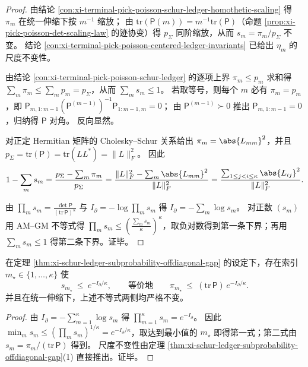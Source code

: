 \begin{proof}
由结论 \ref{con:xi-terminal-pick-poisson-schur-ledger-homothetic-scaling} 得 \(\pi_m\) 在统一伸缩下按 \(m^{-1}\) 缩放；
由 \(\mathrm{tr}(\mathsf P(m))=m^{-1}\mathrm{tr}(\mathsf P)\)（命题 \ref{prop:xi-pick-poisson-det-scaling-law} 的迹协变）得 \(p_\Sigma\) 同阶缩放，从而 \(s_m=\pi_m/p_\Sigma\) 不变。
结论 \ref{con:xi-terminal-pick-poisson-centered-ledger-invariants} 已给出 \(\eta_m\) 的尺度不变性。
\par
由结论 \ref{con:xi-terminal-pick-poisson-schur-ledger} 的逐项上界 \(\pi_m\le p_m\) 求和得 \(\sum_m\pi_m\le\sum_m p_m=p_\Sigma\)，从而 \(\sum_m s_m\le 1\)。
若取等号，则每个 \(m\) 必有 \(\pi_m=p_m\)，即
\(
\mathsf P_{m,1:m-1}(\mathsf P^{(m-1)})^{-1}\mathsf P_{1:m-1,m}=0
\)；
由 \(\mathsf P^{(m-1)}\succ 0\) 推出 \(\mathsf P_{m,1:m-1}=0\)，归纳得 \(\mathsf P\) 对角。
反向显然。
\par
对正定 Hermitian 矩阵的 Cholesky--Schur 关系给出 \(\pi_m=\abs{L_{mm}}^2\)，并且
\(
p_\Sigma=\mathrm{tr}(\mathsf P)=\mathrm{tr}(LL^\ast)=\|L\|_F^2
\)。
因此
\[
1-\sum_m s_m
=\frac{p_\Sigma-\sum_m\pi_m}{p_\Sigma}
=\frac{\|L\|_F^2-\sum_m\abs{L_{mm}}^2}{\|L\|_F^2}
=\frac{\sum_{1\le j<i\le\kappa}\abs{L_{ij}}^2}{\|L\|_F^2}.
\]
\par
由 \(\prod_m s_m=\frac{\det\mathsf P}{(\mathrm{tr}\,\mathsf P)^{\kappa}}\) 与 \(I_\partial=-\log\prod_m s_m\) 得 \(I_\partial=-\sum_m\log s_m\)。
对正数 \((s_m)\) 用 AM--GM 不等式得
\(
\prod_m s_m\le (\frac{\sum_m s_m}{\kappa})^\kappa
\)，取负对数得到第一条下界；再用 \(\sum_m s_m\le 1\) 得第二条下界。证毕。
\end{proof}

\begin{auditcor}\label{cor:xi-schur-ledger-bottleneck-share}
在定理 \ref{thm:xi-schur-ledger-subprobability-offdiagonal-gap} 的设定下，存在索引 \(m_\star\in\{1,\dots,\kappa\}\) 使
\[
s_{m_\star}\ \le\ e^{-I_\partial/\kappa},
\qquad\text{等价地}\qquad
\pi_{m_\star}\ \le\ (\mathrm{tr}\,\mathsf P)\,e^{-I_\partial/\kappa}.
\]
并且在统一伸缩下，上述不等式两侧均严格不变。
\end{auditcor}
\begin{proof}
由 \(I_\partial=-\sum_{m=1}^{\kappa}\log s_m\) 得
\(
\prod_{m=1}^{\kappa}s_m=e^{-I_\partial}
\)。
因此
\(
\min_m s_m\le (\prod_m s_m)^{1/\kappa}=e^{-I_\partial/\kappa}
\)，取达到最小值的 \(m_\star\) 即得第一式；第二式由 \(s_m=\pi_m/(\mathrm{tr}\,\mathsf P)\) 得到。
尺度不变性由定理 \ref{thm:xi-schur-ledger-subprobability-offdiagonal-gap}(1) 直接推出。证毕。
\end{proof}

